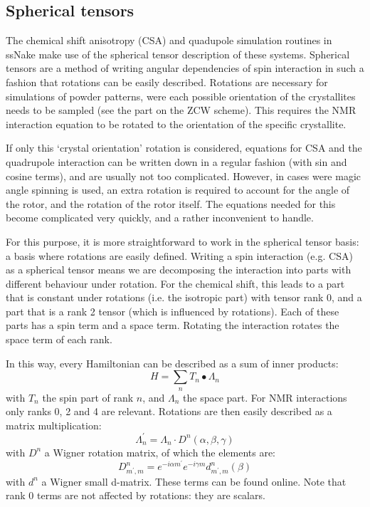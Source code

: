\documentclass[11pt,a4paper]{article}
\begin{document}
\subsection*{Spherical tensors}
The chemical shift anisotropy (CSA) and quadupole simulation routines in ssNake make use of the
spherical tensor description of these systems. Spherical tensors are a method of writing angular
dependencies of spin interaction in such a fashion that rotations can be easily described. Rotations
are necessary for simulations of powder patterns, were each possible orientation of the crystallites
needs to be sampled (see the part on the ZCW scheme). This requires the NMR interaction equation to
be rotated to the orientation of the specific crystallite. 

If only this `crystal orientation' rotation is considered, equations for CSA and the quadrupole
interaction can be written down in a regular fashion (with sin and cosine terms), and are usually
not too complicated. However, in cases were magic angle spinning is used, an extra rotation is
required to account for the angle of the rotor, and the rotation of the rotor itself. The equations
needed for this become complicated very quickly, and a rather inconvenient to handle.

For this purpose, it is more straightforward to work in the spherical tensor basis: a basis where
rotations are easily defined. Writing a spin interaction (e.g. CSA) as a spherical tensor means we
are decomposing the interaction into parts with different behaviour under rotation. For the chemical
shift, this leads to a part that is constant under rotations (i.e. the isotropic part) with tensor
rank 0, and a part that is a rank 2 tensor (which is influenced by rotations). Each of these parts
has a spin term and a space term. Rotating the interaction rotates the space term of each rank.

In this way, every Hamiltonian can be described as a sum of inner products:
\begin{equation}
  H = \sum_{n}  T_n \bullet  \Lambda_n
  \label{eq:HamSphere}
\end{equation}
with $T_n$ the spin part of rank $n$, and $\Lambda_n$ the space part. For NMR interactions only
ranks 0, 2 and 4 are relevant. Rotations are then easily described as a matrix multiplication:
\begin{equation}
\Lambda^\prime_n = \Lambda_n \cdot D^n(\alpha,\beta,\gamma)
\end{equation}
with $D^n$ a Wigner rotation matrix, of which the elements are:
\begin{equation}
  D^n_{m^\prime,m} = e^{-i\alpha m^\prime}e^{-i \gamma m} d^n_{m^\prime,m}(\beta)
\end{equation}
with $d^n$ a Wigner small d-matrix. These terms can be found online. Note that rank 0 terms are not
affected by rotations: they are scalars.
\end{document}

